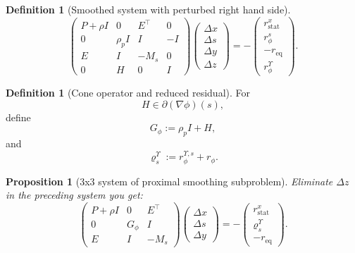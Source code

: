 \documentclass[a4paper,11pt]{book}
\theoremstyle{plain}
\newtheorem{proposition}[theorem]{Proposition}
\theoremstyle{definition}
\newtheorem{definition}[theorem]{Definition}
\theoremstyle{remark}
\numberwithin{equation}{chapter}
\numberwithin{algorithm}{chapter}
\begin{document}
	\begin{definition}[Smoothed system with perturbed right hand side]
		\begin{equation}\label{eq:k4}
			\begin{pmatrix}
				P+\rho I & 0 & E^\top & 0\\
				0 & \rho_p I & I & -I\\
				E & I & -M_s & 0\\
				0 & H & 0 & I
			\end{pmatrix}
			\begin{pmatrix}
				\Delta x\\ \Delta s\\ \Delta y\\ \Delta z
			\end{pmatrix}
			=-
			\begin{pmatrix}
				r_{\mathrm{stat}}^x\\ r_{\phi}^s\\ -r_{\mathrm{eq}}\\
				r_{\phi}^{\Upsilon}
			\end{pmatrix}.
		\end{equation}
	\end{definition}
	
	\begin{definition}[Cone operator and reduced residual]
		
		For
		\[
		H \in \partial\!\left(\nabla \phi\right)(s),
		\]
		define
		\begin{equation}
			G_{\phi} := \rho_p I + H,
			\label{eq:G_phi}
		\end{equation}
		and
		\begin{equation}
			\varrho^\Upsilon_s := r_{\phi}^{\Upsilon,s} + r_{\phi}.
			\label{eq:varrho_s}
		\end{equation}
		
	\end{definition}
	
	\begin{proposition}[3x3 system of proximal smoothing subproblem]
		Eliminate $\Delta z$ in the preceding system you get:
		\begin{equation}
			\begin{pmatrix}
				P+\rho I & 0 & E^{\top}\\
				0 & G_\phi & I\\
				E & I & -M_s
			\end{pmatrix}
			\begin{pmatrix}\Delta x\\ \Delta s\\ \Delta y\end{pmatrix}
			=-\begin{pmatrix}r^{x}_{\mathrm{stat}}\\ \varrho^\Upsilon_s\\ -r_{\mathrm{eq}}\end{pmatrix} .
		\end{equation}
	\end{proposition}
	
\end{document}
